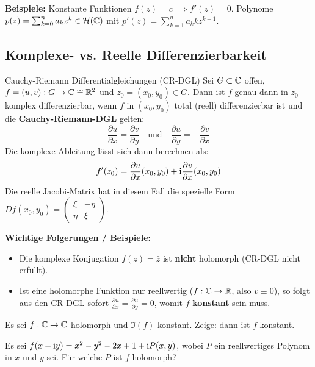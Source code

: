 \textbf{Beispiele:}
Konstante Funktionen $f(z)=c \implies f'(z)=0$. Polynome $p(z) = \sum_{k=0}^n a_k z^k \in \mathcal{H}(\mathbb{C})$ mit $p'(z) = \sum_{k=1}^n a_k k z^{k-1}$.

\subsection{Komplexe- vs. Reelle Differenzierbarkeit}

\begin{satz}{Cauchy-Riemann Differentialgleichungen (CR-DGL)}
Sei $G \subset \mathbb{C}$ offen, $f = (u,v): G \to \mathbb{C} \cong \mathbb{R}^2$ und $z_0 = (x_0, y_0) \in G$. Dann ist $f$ genau dann in $z_0$ komplex differenzierbar, wenn $f$ in $(x_0, y_0)$ total (reell) differenzierbar ist und die \textbf{Cauchy-Riemann-DGL} gelten:
\[
    \frac{\partial u}{\partial x} = \frac{\partial v}{\partial y} \quad \text{und} \quad \frac{\partial u}{\partial y} = -\frac{\partial v}{\partial x}
\]
Die komplexe Ableitung lässt sich dann berechnen als:
\[
    f'(z_0) = \frac{\partial u}{\partial x}(x_0, y_0) + \mathrm{i} \frac{\partial v}{\partial x}(x_0, y_0)
\]
Die reelle Jacobi-Matrix hat in diesem Fall die spezielle Form $Df(x_0, y_0) = \begin{pmatrix} \xi & -\eta \\ \eta & \xi \end{pmatrix}$.
\end{satz}

\textbf{Wichtige Folgerungen / Beispiele:}
\begin{itemize}
    \item Die komplexe Konjugation $f(z) = \bar{z}$ ist \textbf{nicht} holomorph (CR-DGL nicht erfüllt).
    \item Ist eine holomorphe Funktion nur reellwertig ($f: \mathbb{C} \to \mathbb{R}$, also $v \equiv 0$), so folgt aus den CR-DGL sofort $\frac{\partial u}{\partial x} = \frac{\partial u}{\partial y} = 0$, womit $f$ \textbf{konstant} sein muss.
\end{itemize}

\vspace{0.5cm}
\begin{tcolorbox}[colback=yellow!5!white, colframe=orange!75!black, fonttitle=\bfseries, title={Übungsblatt 1, Aufgabe 3}]
Es sei $f: \mathbb{C} \to \mathbb{C}$ holomorph und $\Im(f)$ konstant. Zeige: dann ist $f$ konstant.
\end{tcolorbox}

\begin{tcolorbox}[colback=yellow!5!white, colframe=orange!75!black, fonttitle=\bfseries, title={Übungsblatt 1, Aufgabe 5}]
Es sei $f(x + \mathrm{i} y) = x^2 - y^2 - 2x + 1 + \mathrm{i} P(x,y)$, wobei $P$ ein reellwertiges Polynom in $x$ und $y$ sei. Für welche $P$ ist $f$ holomorph?
\end{tcolorbox}
